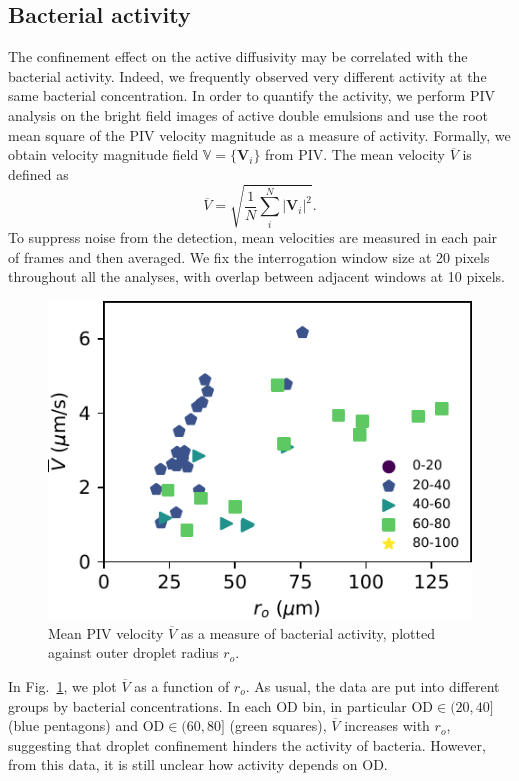 \documentclass[%
10pt,
superscriptaddress,
twocolumn,
 amsmath,amssymb,
 aps,prx,
]{revtex4-2}
\begin{document}
\subsection{Bacterial activity}

The confinement effect on the active diffusivity may be correlated with the bacterial activity.
Indeed, we frequently observed very different activity at the same bacterial concentration.
In order to quantify the activity, we perform PIV analysis on the bright field images of active double emulsions and use the root mean square of the PIV velocity magnitude as a measure of activity.
Formally, we obtain velocity magnitude field $\mathbb{V}=\{\bm{V}_{i}\}$ from PIV.
The mean velocity $\overline V$ is defined as
%
\begin{equation}
    \overline V = \sqrt{\frac{1}{N}\sum_{i}^N |\bm{V}_{i}|^2}.
\end{equation}
%
To suppress noise from the detection, mean velocities are measured in each pair of frames and then averaged. 
We fix the interrogation window size at 20 pixels throughout all the analyses, with overlap between adjacent windows at 10 pixels.

\begin{figure}[!t]
  \includegraphics[width=\columnwidth]{bacterial-activity}
  \caption{
  Mean PIV velocity $\overline V$ as a measure of bacterial activity, plotted against outer droplet radius $r_o$.
  }
  \label{fig:bacterial-activity}
\end{figure}

In Fig.~\ref{fig:bacterial-activity}, we plot $\overline V$ as a function of $r_o$.
As usual, the data are put into different groups by bacterial concentrations.
In each OD bin, in particular $\text{OD}\in(20, 40]$ (blue pentagons) and $\text{OD}\in(60, 80]$ (green squares), $\overline V$ increases with $r_o$, suggesting that droplet confinement hinders the activity of bacteria.
However, from this data, it is still unclear how activity depends on OD.
\end{document}

